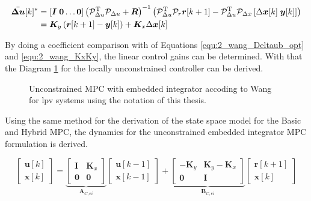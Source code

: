\begin{align}
	\Deltaub^*
	&= [\bm{I}\; \bm{0} \hdots \bm{0}]
	\left(
	\mathcal{\bm P}_{\Delta u}^\T
	\mathcal{\bm P}_{\Delta u}
	+ \bm{R}
	\right)^{-1}
	\left(
	\mathcal{\bm P}_{\Delta u}^\T
	\mathcal{\bm P}_{r} \bm{r}[k+1]
	-
	\mathcal{\bm P}_{\Delta u}^\T
	\mathcal{\bm P}_{\Delta x}
	\left[\Delta \x[k]\; \bm{y}[k]\right] %
	\right)
	\label{equ:2_wang_Deltaub_opt}
	\\
	&= \bm{K}_y
	\left(
	\bm{r}[k+1] - \bm{y}[k]
	\right)
	+ \bm{K}_x \Delta \x[k]
	\label{equ:2_wang_KxKy}
\end{align}

By doing a coefficient comparison with of Equations \eqref{equ:2_wang_Deltaub_opt} and \eqref{equ:2_wang_KxKy}, the linear control gains can be determined. With that the Diagram \ref{fig:Wang_MPC_unconstrained} for the locally unconstrained controller can be derived.

\begin{figure}[H]
	\centering
	
	\caption{Unconstrained MPC with embedded integrator accoding to Wang  \cite{mpcWang} for \acrshort{lpv} systems using the notation of this thesis.}
	\label{fig:Wang_MPC_unconstrained}
\end{figure}

Using the same method for the derivation of the state space model for the Basic and Hybrid MPC, the dynamics for the unconstrained embedded integrator MPC formulation is derived.

\begin{equation}
	\begin{bmatrix}
		\bm{u}[k] \\ \bm{x}[k]
	\end{bmatrix}
	= 
	\underbrace{
		\begin{bmatrix}
			\bm{I} & \bm{K}_x \\ \bm{0} & \bm{0}
	\end{bmatrix}}_{\bm{A}_{C,ei}} 
	\begin{bmatrix}
		\bm{u}[k-1] \\ \bm{x}[k-1]
	\end{bmatrix} 
	+
	\underbrace{
		\begin{bmatrix}
			-\bm{K}_y & \bm{K}_y - \bm{K}_x \\
			\bm{0} & \bm{I} 
	\end{bmatrix}}_{\bm{B}_{C,ei}}
	\begin{bmatrix}
		\bm{r}[k+1]\\
		\bm{x}[k]
	\end{bmatrix}
	\label{equ:2_ss_ei_mpc}
\end{equation}

